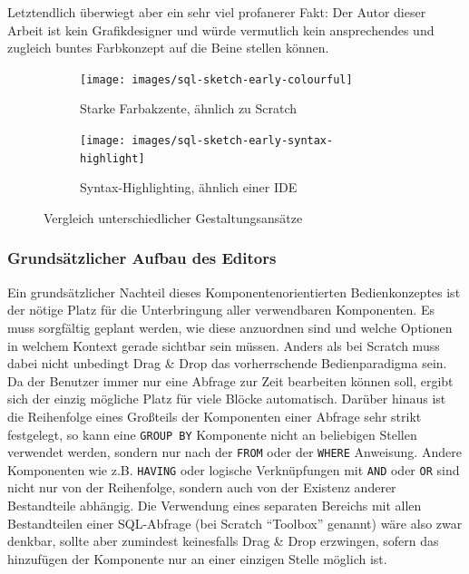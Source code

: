 Letztendlich überwiegt aber ein sehr viel profanerer Fakt: Der Autor dieser Arbeit ist kein Grafikdesigner und würde vermutlich kein ansprechendes und zugleich buntes Farbkonzept auf die Beine stellen können.

\begin{figure}[h]
  \begin{subfigure}[b]{0.45\textwidth}
    \texttt{[image: images/sql-sketch-early-colourful]}
    \caption{Starke Farbakzente, ähnlich zu Scratch}
    \label{fig:screen-sql-editor-early-colourful}
  \end{subfigure}\hfill
  \begin{subfigure}[b]{0.45\textwidth}
    \texttt{[image: images/sql-sketch-early-syntax-highlight]}
    \caption{Syntax-Highlighting, ähnlich einer IDE}
    \label{fig:screen-sql-editor-early-syntax-highlighting}
  \end{subfigure}
  \caption{Vergleich unterschiedlicher Gestaltungsansätze}
  \label{fig:compare-colourful}
\end{figure}

\subsubsection{Grundsätzlicher Aufbau des Editors}

Ein grundsätzlicher Nachteil dieses Komponentenorientierten Bedienkonzeptes ist der nötige Platz für die Unterbringung aller verwendbaren Komponenten. Es muss sorgfältig geplant werden, wie diese anzuordnen sind und welche Optionen in welchem Kontext gerade sichtbar sein müssen. Anders als bei Scratch muss dabei nicht unbedingt Drag \& Drop das vorherrschende Bedienparadigma sein. Da der Benutzer immer nur eine Abfrage zur Zeit bearbeiten können soll, ergibt sich der einzig mögliche Platz für viele Blöcke automatisch. Darüber hinaus ist die Reihenfolge eines Großteils der Komponenten einer Abfrage sehr strikt festgelegt, so kann eine \texttt{GROUP BY} Komponente nicht an beliebigen Stellen verwendet werden, sondern nur nach der \texttt{FROM} oder der \texttt{WHERE} Anweisung. Andere Komponenten wie z.B. \texttt{HAVING} oder logische Verknüpfungen mit \texttt{AND} oder \texttt{OR} sind nicht nur von der Reihenfolge, sondern auch von der Existenz anderer Bestandteile abhängig. Die Verwendung eines separaten Bereichs mit allen Bestandteilen einer SQL-Abfrage (bei Scratch ``Toolbox'' genannt) wäre also zwar denkbar, sollte aber zumindest keinesfalls Drag \& Drop erzwingen, sofern das hinzufügen der Komponente nur an einer einzigen Stelle möglich ist.

